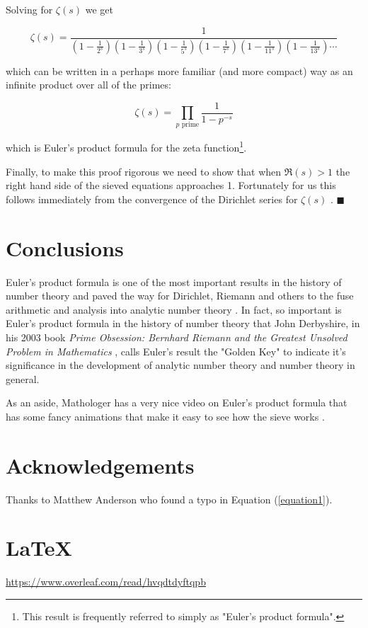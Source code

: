 \documentclass[11pt, oneside]{article}   	%
\begin{document}
\bigskip
\noindent
Solving for $\zeta(s)$ we get

\bigskip
\begin{equation*}
\zeta (s) = \frac {1}{\left ( 1 - \frac {1}{2^{s}} \right ) \left
( 1 - \frac {1}{3^{s}} \right ) \left ( 1 - \frac {1}{5^{s}}
\right ) \left ( 1 - \frac {1}{7^{s}} \right )  
 \left ( 1 - \frac {1}{11^{s}} \right ) \left ( 1 - \frac {1}{13^{s}} \right )\cdots}
\end{equation*}

\bigskip
\bigskip
\noindent
which can be written in a perhaps more familiar (and more
compact) way as an infinite product over all of the primes:

\bigskip
\begin{equation*}
\zeta (s) = \prod _{p{\text{ prime}}} \frac {1}{1-p^{-s}}
\end{equation*}

\bigskip
\noindent
which is Euler's product formula for the zeta
function\footnote{This result is frequently referred to simply as
"Euler's product formula".}.

\bigskip
\noindent
Finally, to make this proof rigorous we need to show that when
$\Re (s) > 1$ the right hand side of the sieved equations
approaches 1.  Fortunately for us this follows immediately from
the convergence of the Dirichlet series for $\zeta(s)$
\cite{wiki:dirichlet_series}. $\blacksquare$

\section{Conclusions}
Euler's product formula is one of the most important results in
the history of number theory and paved the way for Dirichlet,
Riemann and others to the fuse arithmetic and analysis into
analytic number theory \cite{wiki:analytic_number_theory}.  In
fact, so important is Euler's product formula in the history of
number theory that John Derbyshire, in his 2003 book \emph{Prime
Obsession: Bernhard Riemann and the Greatest Unsolved Problem in
Mathematics} \cite{book:prime_obsession}, calls Euler's result
the "Golden Key" to indicate it's significance in the development
of analytic number theory and number theory in general.

\bigskip
\noindent
As an aside, Mathologer has a very nice video on Euler's product
formula that has some fancy animations that make it easy to see
how the sieve works \cite{mathologer:eulers_product_formula}.
%
%
%
\section*{Acknowledgements}
Thanks to Matthew Anderson who found a typo in 
Equation (\ref{equation1}).

%
%
\section*{\LaTeX}
\url{https://www.overleaf.com/read/hvqdtdyftqpb}
%
%
%


%
\end{document}

